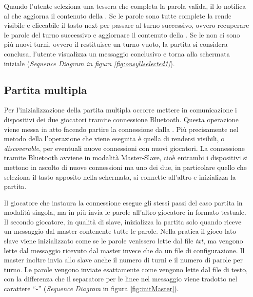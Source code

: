 

Quando l'utente seleziona una tessera che completa la parola valida, il  lo notifica al  che aggiorna il contenuto della . Se le parole sono tutte complete la  rende visibile e cliccabile il tasto next per passare al turno successivo, ovvero recuperare le parole del turno successivo e aggiornare il contenuto della . Se le non ci sono più nuovi turni, ovvero il  restituisce un turno vuoto, la partita si considera conclusa, l'utente visualizza un messaggio conclusivo e torna alla schermata iniziale (\textit{Sequence Diagram in figura \ref{fig:onsyllselected1}}).

\subsection{Partita multipla}
Per l'inizializzazione della partita multipla occorre mettere in comunicazione i dispositivi dei due giocatori tramite connessione Bluetooth. Questa operazione viene messa in atto facendo partire la connessione dalla . Più precisamente nel metodo  della  l'operazione che viene eseguita è quella di rendersi visibili, o \emph{discoverable}, per eventuali nuove connessioni con nuovi giocatori. La connessione tramite Bluetooth avviene in modalità Master-Slave, cioè entrambi i dispositivi si mettono in ascolto di nuove connessioni ma uno dei due, in particolare quello che seleziona il tasto apposito nella schermata, si connette all'altro e inizializza la partita.

Il giocatore che instaura la connessione esegue gli stessi passi del caso partita in modalità singola, ma in più invia le parole all'altro giocatore in formato testuale. Il secondo giocatore, in qualità di slave, inizializza la partita solo quando riceve un messaggio dal master contenente tutte le parole. Nella pratica il gioco lato slave viene inizializzato come se le parole venissero lette dal file \emph{txt}, ma vengono lette dal messaggio ricevuto dal master invece che da un file di configurazione. Il master inoltre invia allo slave anche il numero di turni e il numero di parole per turno. Le parole vengono inviate esattamente come vengono lette dal file di testo, con la differenza che il separatore per le linee nel messaggio viene tradotto nel carattere ``-'' (\textit{Sequence Diagram} in figura \ref{fig:initMaster}).

